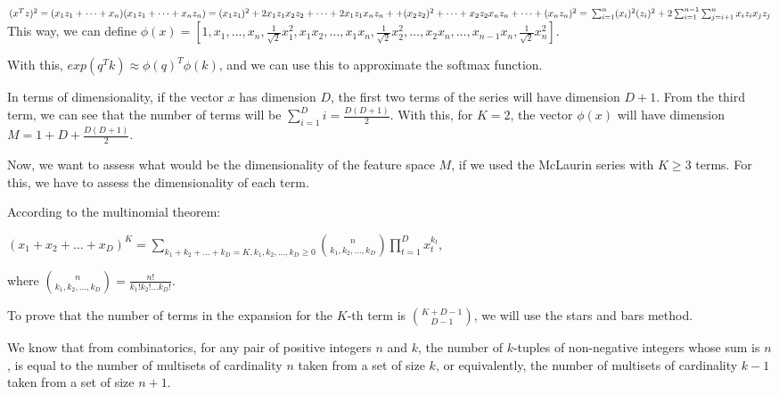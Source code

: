 \documentclass{article}
\begin{document}
\medskip

$ (x^Tz)^2 = (x_1z_1 + \dots + x_n)(x_1z_1 + \dots + x_nz_n) = \\
(x_1z_1)^2 + 2x_1z_1x_2z_2 + \dots + 2x_1z_1x_nz_n + 
+ (x_2z_2)^2 + \dots + x_2z_2x_nz_n + \dots + (x_nz_n)^2 = \\
\sum_{i=1}^n (x_i)^2(z_i)^2 + 2\sum_{i=1}^{n-1} \sum_{j=i+1}^{n} x_iz_ix_jz_j$\\


This way, we can define $\phi(x) = [1, x_1, \dots, x_n, 
\frac{1}{\sqrt{2}}x_1^{2}, x_1x_2, \dots, x_1x_n, \frac{1}{\sqrt{2}}x_2^{2}, \dots, 
x_2x_n, \dots, x_{n-1}x_n , \frac{1}{\sqrt{2}}x_n^{2}]$.

With this, $exp(q^Tk) \approx \phi(q)^T \phi(k)$, and we can use this to approximate the softmax function.

\bigskip

In terms of dimensionality, if the vector $x$ has dimension $D$, the first two terms of the series will have dimension $D + 1$. From the 
third term, we can see that the number of terms will be $\sum_{i=1}^{D} i = \frac{D(D+1)}{2}$. With this, for $K = 2$, 
the vector $\phi(x)$ will have dimension $M = 1 + D + \frac{D(D+1)}{2}$.

\bigskip

Now, we want to assess what would be the dimensionality of the feature space $M$, if we used the McLaurin series with $K \geq 3$ terms.
For this, we have to assess the dimensionality of each term.

\bigskip

According to the multinomial theorem:

\medskip

$ (x_1 + x_2 + \dots + x_D)^K = \sum_{k_1 + k_2 + \dots + k_D = K, k_1, k_2, \dots, k_D\geq0} \binom{n}{k_1, k_2, \dots, k_D} \prod_{t=1}^D x_t^{k_t}$,

where $\binom{n}{k_1, k_2, \dots, k_D} = \frac{n!}{k_1!k_2!\dots k_D!}$.

\bigskip

To prove that the number of terms in the expansion for the $K$-th term is $\binom{K + D - 1}{D - 1}$, we will use the stars and bars method.

We know that from combinatorics, for any pair of positive integers $n$ and $k$, the number of $k$-tuples of non-negative integers whose sum is $n$, is equal to the number of 
multisets of cardinality $n$ taken from a set of size $k$, or equivalently, the number of multisets of cardinality $k - 1$ taken from a set of size $n + 1$.
\end{document}
